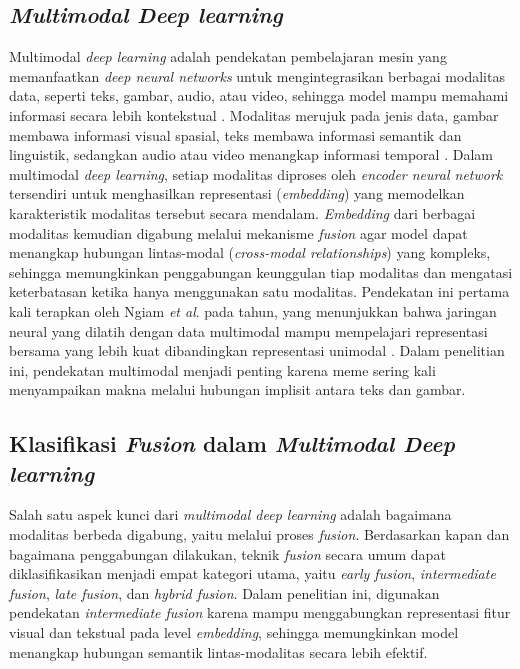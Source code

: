\subsection{\textit{Multimodal Deep learning}} \label{II.teori7}
Multimodal \textit{deep learning} adalah pendekatan pembelajaran mesin yang memanfaatkan \textit{deep neural networks} untuk mengintegrasikan berbagai modalitas data, seperti teks, gambar, audio, atau video, sehingga model mampu memahami informasi secara lebih kontekstual \cite{ngiam2011multimodal}. Modalitas merujuk pada jenis data, gambar membawa informasi visual spasial, teks membawa informasi semantik dan linguistik, sedangkan audio atau video menangkap informasi temporal \cite{IBM2024multimodal}. Dalam multimodal \textit{deep learning}, setiap modalitas diproses oleh \textit{encoder neural network} tersendiri untuk menghasilkan representasi (\textit{embedding}) yang memodelkan karakteristik modalitas tersebut secara mendalam. \textit{Embedding} dari berbagai modalitas kemudian digabung melalui mekanisme \textit{fusion} agar model dapat menangkap hubungan lintas-modal (\textit{cross-modal relationships}) yang kompleks, sehingga memungkinkan penggabungan keunggulan tiap modalitas dan mengatasi keterbatasan ketika hanya menggunakan satu modalitas. Pendekatan ini pertama kali terapkan oleh Ngiam \textit{et al}. pada tahun, yang menunjukkan bahwa jaringan neural yang dilatih dengan data multimodal mampu mempelajari representasi bersama yang lebih kuat dibandingkan representasi unimodal \cite{ngiam2011multimodal}. Dalam penelitian ini, pendekatan multimodal menjadi penting karena meme sering kali menyampaikan makna melalui hubungan implisit antara teks dan gambar.


\subsection{Klasifikasi \textit{Fusion} dalam \textit{Multimodal Deep learning}} \label{II.teori8}
Salah satu aspek kunci dari \textit{multimodal deep learning} adalah bagaimana modalitas berbeda digabung, yaitu melalui proses \textit{fusion}. Berdasarkan kapan dan bagaimana penggabungan dilakukan, teknik \textit{fusion} secara umum dapat diklasifikasikan menjadi empat kategori utama, yaitu \textit{early fusion}, \textit{intermediate fusion}, \textit{late fusion}, dan \textit{hybrid fusion}. Dalam penelitian ini, digunakan pendekatan \textit{intermediate fusion} karena mampu menggabungkan representasi fitur visual dan tekstual pada level \textit{embedding}, sehingga memungkinkan model menangkap hubungan semantik lintas-modalitas secara lebih efektif.

